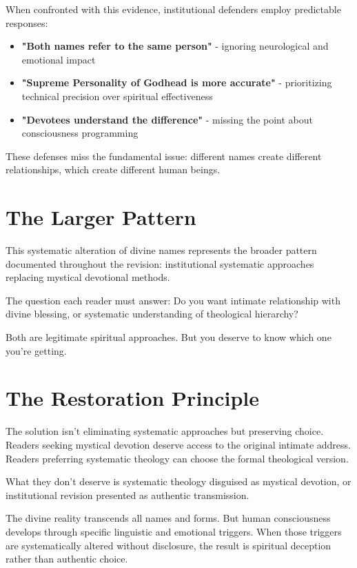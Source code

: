 \documentclass[11pt,twoside]{book}
\begin{document}
When confronted with this evidence, institutional defenders employ predictable responses:

\begin{itemize}
\item \textbf{\textbf{"Both names refer to the same person"}} - ignoring neurological and emotional impact
\item \textbf{\textbf{"Supreme Personality of Godhead is more accurate"}} - prioritizing technical precision over spiritual effectiveness
\item \textbf{\textbf{"Devotees understand the difference"}} - missing the point about consciousness programming
\end{itemize}

These defenses miss the fundamental issue: different names create different relationships, which create different human beings.
\section*{The Larger Pattern}
\label{sec:org5f29849}

This systematic alteration of divine names represents the broader pattern documented throughout the revision: institutional systematic approaches replacing mystical devotional methods.

The question each reader must answer: Do you want intimate relationship with divine blessing, or systematic understanding of theological hierarchy?

Both are legitimate spiritual approaches. But you deserve to know which one you're getting.
\section*{The Restoration Principle}
\label{sec:orgf1cf71d}

The solution isn't eliminating systematic approaches but preserving choice. Readers seeking mystical devotion deserve access to the original intimate address. Readers preferring systematic theology can choose the formal theological version.

What they don't deserve is systematic theology disguised as mystical devotion, or institutional revision presented as authentic transmission.

The divine reality transcends all names and forms. But human consciousness develops through specific linguistic and emotional triggers. When those triggers are systematically altered without disclosure, the result is spiritual deception rather than authentic choice.
\end{document}
